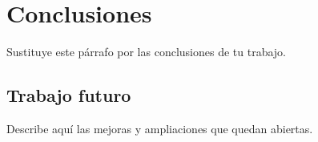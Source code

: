 \chapter{Conclusiones}\label{cap:conclusiones}

Sustituye este párrafo por las conclusiones de tu trabajo.

\section{Trabajo futuro}

Describe aquí las mejoras y ampliaciones que quedan abiertas.
